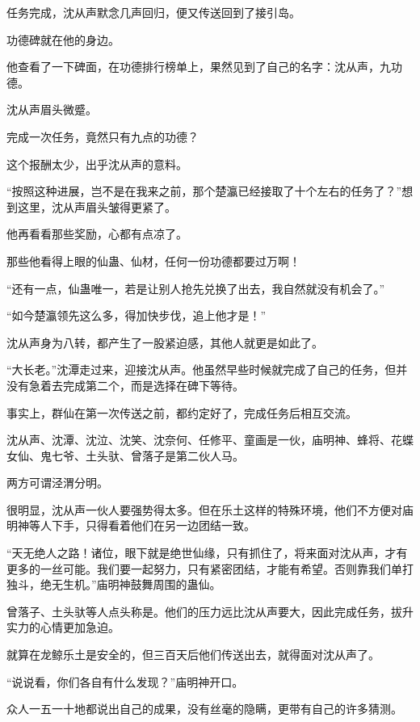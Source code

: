 
\begin{this_body}

任务完成，沈从声默念几声回归，便又传送回到了接引岛。

功德碑就在他的身边。

他查看了一下碑面，在功德排行榜单上，果然见到了自己的名字：沈从声，九功德。

沈从声眉头微蹙。

完成一次任务，竟然只有九点的功德？

这个报酬太少，出乎沈从声的意料。

“按照这种进展，岂不是在我来之前，那个楚瀛已经接取了十个左右的任务了？”想到这里，沈从声眉头皱得更紧了。

他再看看那些奖励，心都有点凉了。

那些他看得上眼的仙蛊、仙材，任何一份功德都要过万啊！

“还有一点，仙蛊唯一，若是让别人抢先兑换了出去，我自然就没有机会了。”

“如今楚瀛领先这么多，得加快步伐，追上他才是！”

沈从声身为八转，都产生了一股紧迫感，其他人就更是如此了。

“大长老。”沈潭走过来，迎接沈从声。他虽然早些时候就完成了自己的任务，但并没有急着去完成第二个，而是选择在碑下等待。

事实上，群仙在第一次传送之前，都约定好了，完成任务后相互交流。

沈从声、沈潭、沈泣、沈笑、沈奈何、任修平、童画是一伙，庙明神、蜂将、花蝶女仙、鬼七爷、土头驮、曾落子是第二伙人马。

两方可谓泾渭分明。

很明显，沈从声一伙人要强势得太多。但在乐土这样的特殊环境，他们不方便对庙明神等人下手，只得看着他们在另一边团结一致。

“天无绝人之路！诸位，眼下就是绝世仙缘，只有抓住了，将来面对沈从声，才有更多的一丝可能。我们要一起努力，只有紧密团结，才能有希望。否则靠我们单打独斗，绝无生机。”庙明神鼓舞周围的蛊仙。

曾落子、土头驮等人点头称是。他们的压力远比沈从声要大，因此完成任务，拔升实力的心情更加急迫。

就算在龙鲸乐土是安全的，但三百天后他们传送出去，就得面对沈从声了。

“说说看，你们各自有什么发现？”庙明神开口。

众人一五一十地都说出自己的成果，没有丝毫的隐瞒，更带有自己的许多猜测。


\end{this_body}
